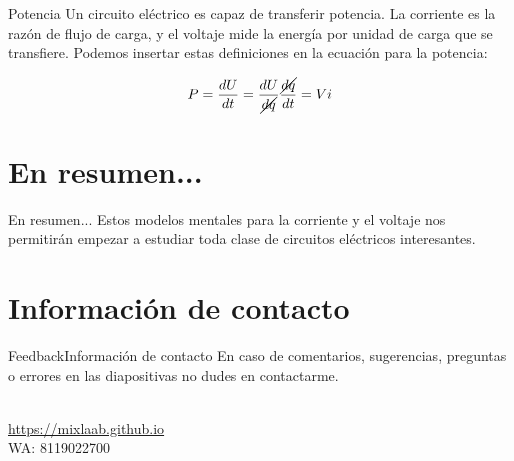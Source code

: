 \documentclass[10pt]{beamer}
\newcommand{\chref}[2]{%
  \href{#1}{{\usebeamercolor[bg]{Aalborg}#2}}%
}
\begin{document}
\begin{frame}{Potencia}{}
Un circuito eléctrico es capaz de transferir potencia. La corriente es la razón de flujo de carga, y el voltaje mide la energía por unidad de carga que se transfiere. Podemos insertar estas definiciones en la ecuación para la potencia:

\begin{equation}
    P = \frac{dU}{dt} = \frac{dU}{\cancel{dq}} \frac{\cancel{dq}}{dt} = V i
\end{equation}
\end{frame}

\section{En resumen...}
\begin{frame}{En resumen...}{}
Estos modelos mentales para la corriente y el voltaje nos permitirán empezar a estudiar toda clase de circuitos eléctricos interesantes.
\end{frame}

\section{Información de contacto}
\begin{frame}{Feedback}{Información de contacto}
En caso de comentarios, sugerencias, preguntas o errores en las diapositivas no dudes en contactarme.
  \begin{center}
    \insertauthor\\
    \chref{https://mixlaab.github.io}{https://mixlaab.github.io}\\
    WA: 8119022700\\
  \end{center}
\end{frame}

{\aauwavesbg%
\begin{frame}%
\end{frame}}
\end{document}
